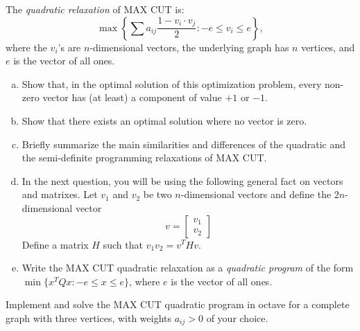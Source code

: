 \documentclass[fleqn]{homework}
\begin{document}
  \begin{problem}{3}
    \begin{question}
      The \textit{quadratic relaxation} of MAX CUT is:
      \begin{equation*}
        \max \left\{\sum a_{ij} \frac{1 - v_i \cdot v_j}{2}: -e \le v_i \le e\right\},
      \end{equation*}
      where the $v_i$'s are $n$-dimensional vectors, the underlying graph has
      $n$ vertices, and $e$ is the vector of all ones.
      \begin{enumerate}[a.]
      \item Show that, in the optimal solution of this optimization problem,
        every non-zero vector has (at least) a component of value $+1$ or $-1$.
      \item Show that there exists an optimal solution where no vector is zero.
      \item Briefly summarize the main similarities and differences of the
        quadratic and the semi-definite programming relaxations of MAX CUT.
      \item In the next question, you will be using the following general fact
        on vectors and matrixes. Let $v_1$ and $v_2$ be two $n$-dimensional
        vectors and define the $2n$-dimensional vector
        \begin{equation*}
          v = \begin{bmatrix*} v_1 \\ v_2 \end{bmatrix*}
        \end{equation*}
        Define a matrix $H$ such that $v_1 v_2 = v^T H v$.
      \item Write the MAX CUT quadratic relaxation as a \textit{quadratic
          program} of the form $\min\{x^TQx: -e \le x \le e \}$, where $e$ is
        the vector of all ones.
      \end{enumerate}
    \end{question}
  \end{problem}

  \begin{problem}{4}
    \begin{question}
      Implement and solve the MAX CUT quadratic program in octave for a complete
      graph with three vertices, with weights $a_{ij} > 0$ of your choice.
    \end{question}
  \end{problem}
\end{document}
